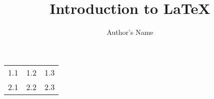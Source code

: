 \documentclass{article}
\begin{document}
\title{Introduction to \LaTeX{}}
\author{Author's Name}

\maketitle

\begin{tabular}{lll}
   1.1 & 1.2 & 1.3 \\
   2.1 & 2.2 & 2.3 \\
\end{tabular}
\end{document}
